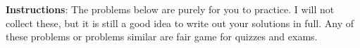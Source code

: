 \documentclass[11pt]{exam}
\def\N{\mathbb{N}}
\def\st{~:~}
\begin{document}
\noindent \textbf{Instructions}: The problems below are purely for you to practice.  I will not collect these, but it is still a good idea to write out your solutions in full.  Any of these problems or problems similar are fair game for quizzes and exams.  

\begin{questions}
\question %

 \question %
\end{questions}
\end{document}
